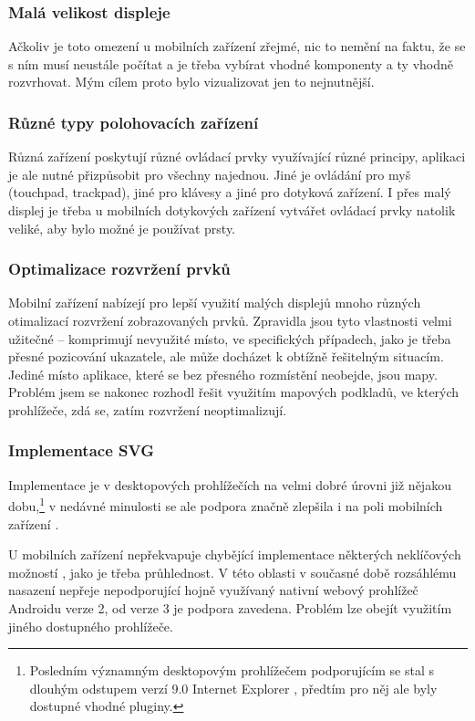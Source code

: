 \subsubsection{Malá velikost displeje}
Ačkoliv je toto omezení u mobilních zařízení zřejmé, nic to nemění na faktu, že se s ním musí neustále počítat a je třeba vybírat vhodné komponenty a ty vhodně rozvrhovat. Mým cílem proto bylo vizualizovat jen to nejnutnější.

\subsubsection{Různé typy polohovacích zařízení}
Různá zařízení poskytují různé ovládací prvky využívající různé principy, aplikaci je ale nutné přizpůsobit pro všechny najednou. Jiné je ovládání pro myš (touchpad, trackpad), jiné pro klávesy a jiné pro dotyková zařízení. I přes malý displej je třeba u mobilních dotykových zařízení vytvářet ovládací prvky natolik veliké, aby bylo možné je používat prsty.

\subsubsection{Optimalizace rozvržení prvků}
Mobilní zařízení nabízejí pro lepší využití malých displejů mnoho různých otimalizací rozvržení zobrazovaných prvků. Zpravidla jsou tyto vlastnosti velmi užitečné -- komprimují nevyužité místo, ve specifických případech, jako je třeba přesné pozicování ukazatele, ale může docházet k obtížně řešitelným situacím. Jediné místo aplikace, které se bez přesného rozmístění neobejde, jsou mapy. Problém jsem se nakonec rozhodl řešit využitím   mapových podkladů, ve kterých prohlížeče, zdá se, zatím rozvržení neoptimalizují.

\subsubsection{Implementace SVG}
Implementace  je v desktopových prohlížečích na velmi dobré úrovni již nějakou dobu,\footnote{Posledním významným desktopovým prohlížečem podporujícím  se stal s dlouhým odstupem verzí 9.0 Internet Explorer \cite{CanIUse}, předtím pro něj ale byly dostupné vhodné pluginy.} v nedávné minulosti se ale podpora značně zlepšila i na poli mobilních zařízení \cite{CanIUse}.

U mobilních zařízení nepřekvapuje chybějící implementace některých neklíčových možností , jako je třeba průhlednost. V této oblasti v současné době rozsáhlému nasazení nepřeje  nepodporující hojně využívaný nativní webový prohlížeč Androidu verze 2, od verze 3 je podpora zavedena. Problém lze obejít využitím jiného dostupného prohlížeče.

